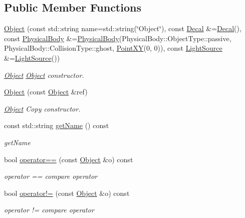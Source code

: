 \subsection*{Public Member Functions}
\begin{DoxyCompactItemize}
\item 
\hyperlink{classObject_af6520fb8cac84e70aec3ea95a88a31db}{Object} (const std\+::string name=std\+::string(\char`\"{}Object\char`\"{}), const \hyperlink{classDecal}{Decal} \&=\hyperlink{classDecal}{Decal}(), const \hyperlink{classPhysicalBody}{Physical\+Body} \&=\hyperlink{classPhysicalBody}{Physical\+Body}(Physical\+Body\+::\+Object\+Type\+::passive, Physical\+Body\+::\+Collision\+Type\+::ghost, \hyperlink{classPointXY}{Point\+X\+Y}(0, 0)), const \hyperlink{classLightSource}{Light\+Source} \&=\hyperlink{classLightSource}{Light\+Source}())
\begin{DoxyCompactList}\small\item\em \hyperlink{classObject}{Object} \hyperlink{classObject}{Object} constructor. \end{DoxyCompactList}\item 
\hyperlink{classObject_ade44910f4febbfdf035f3e33cfdb8af8}{Object} (const \hyperlink{classObject}{Object} \&ref)
\begin{DoxyCompactList}\small\item\em \hyperlink{classObject}{Object} Copy constructor. \end{DoxyCompactList}\item 
const std\+::string \hyperlink{classObject_a684b557e9a8f93987298ffa45beda51c}{get\+Name} () const 
\begin{DoxyCompactList}\small\item\em get\+Name \end{DoxyCompactList}\item 
bool \hyperlink{classObject_ac91f3c50f6cd45557836cf52d29ea03f}{operator==} (const \hyperlink{classObject}{Object} \&o) const 
\begin{DoxyCompactList}\small\item\em operator == compare operator \end{DoxyCompactList}\item 
bool \hyperlink{classObject_a93e19069474d6fdd44c744282f4ffe27}{operator!=} (const \hyperlink{classObject}{Object} \&o) const 
\begin{DoxyCompactList}\small\item\em operator != compare operator \end{DoxyCompactList}\end{DoxyCompactItemize}
